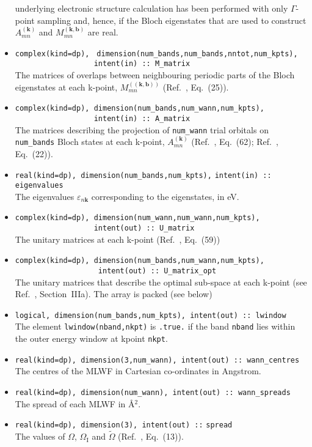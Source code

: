\begin{itemize}
  underlying electronic structure calculation has been performed with
  only $\Gamma$-point sampling and, hence, if the Bloch eigenstates
  that are used to construct $A_{mn}^{(\mathbf{k})}$ and
  $M_{mn}^{\mathbf{(k,b)}}$ are real.
\item \verb#complex(kind=dp),#
      \verb# dimension(num_bands,num_bands,nntot,num_kpts),#\\
      \verb#                  intent(in) :: M_matrix#\\ 
      The matrices of overlaps between neighbouring periodic parts of
      the Bloch eigenstates at each k-point, $M_{mn}^{(\mathbf{(k,b)})}$
      (Ref.~\cite{MV}, Eq.~(25)).
\item \verb#complex(kind=dp), dimension(num_bands,num_wann,num_kpts),#\\
      \verb#                  intent(in) :: A_matrix# \\The matrices
      describing the projection of \verb#num_wann# trial orbitals on
      \verb#num_bands# Bloch states at each k-point,
      $A_{mn}^{(\mathbf{k})}$ (Ref.~\cite{MV}, Eq.~(62);
      Ref.~\cite{SMV}, Eq.~(22)).
\item \verb#real(kind=dp), dimension(num_bands,num_kpts),#
      \verb#intent(in) :: eigenvalues#\\ The
      eigenvalues $\varepsilon_{n\mathbf{k}}$ corresponding to the
      eigenstates, in eV.
\item \verb#complex(kind=dp), dimension(num_wann,num_wann,num_kpts),#\\
      \verb#                  intent(out) :: U_matrix#\\ The unitary
      matrices at each k-point (Ref.~\cite{MV}, Eq.~(59))
\item \verb#complex(kind=dp), dimension(num_bands,num_wann,num_kpts),#\\
      \verb#                   intent(out) :: U_matrix_opt#\\ The
      unitary matrices that describe the optimal sub-space at each
      k-point (see Ref.~\cite{SMV}, Section~{\sc IIIa}). The array is
      packed (see below) 
\item \verb#logical, dimension(num_bands,num_kpts), intent(out) :: lwindow#\\ 
       The element \verb#lwindow(nband,nkpt)# is {\tt .true.} if the band
{\tt nband} lies within the outer energy window at kpoint {\tt nkpt}.
\item \verb#real(kind=dp), dimension(3,num_wann), intent(out) :: wann_centres#\\   
      The centres of the MLWF in Cartesian co-ordinates in Angstrom. 
\item \verb#real(kind=dp), dimension(num_wann), intent(out) :: wann_spreads#\\ 
      The spread of each MLWF in \AA$^{2}$.
\item \verb#real(kind=dp), dimension(3), intent(out) ::#
      \verb#spread#\\ 
      The values of $\Omega$, $\Omega_{\mathrm{I}}$ and
      $\tilde{\Omega}$ (Ref.~\cite{MV}, Eq.~(13)). 
\end{itemize}

